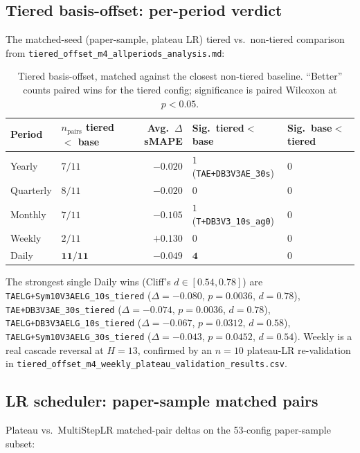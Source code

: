 \documentclass{article}
\begin{document}
\subsection{Tiered basis-offset: per-period verdict}
\label{app:ablations:tiered}

The matched-seed (paper-sample, plateau LR) tiered vs.\ non-tiered comparison from \texttt{tiered\_offset\_m4\_allperiods\_analysis.md}:

\begin{table}[h]
\centering
\small
\caption{Tiered basis-offset, matched against the closest non-tiered baseline. ``Better'' counts paired wins for the tiered config; significance is paired Wilcoxon at $p<0.05$.}
\label{tab:tiered_per_period}
\begin{tabular}{@{}llrll@{}}
\toprule
Period & $n_\text{pairs}$ tiered $<$ base & Avg.\ $\Delta$ sMAPE & Sig.\ tiered$<$base & Sig.\ base$<$tiered \\
\midrule
Yearly    & $7/11$  & $-0.020$ & $1$ (\texttt{TAE+DB3V3AE\_30s}) & $0$ \\
Quarterly & $8/11$  & $-0.020$ & $0$ & $0$ \\
Monthly   & $7/11$  & $-0.105$ & $1$ (\texttt{T+DB3V3\_10s\_ag0}) & $0$ \\
Weekly    & $2/11$  & $\mathbf{+0.130}$ & $0$ & $0$ \\
Daily     & $\mathbf{11/11}$ & $\mathbf{-0.049}$ & $\mathbf{4}$ & $0$ \\
\bottomrule
\end{tabular}
\end{table}

The strongest single Daily wins (Cliff's $d \in [0.54, 0.78]$) are \texttt{TAELG+Sym10V3AELG\_10s\_tiered} ($\Delta = -0.080$, $p=0.0036$, $d=0.78$), \texttt{TAE+DB3V3AE\_30s\_tiered} ($\Delta = -0.074$, $p=0.0036$, $d=0.78$), \texttt{TAELG+DB3V3AELG\_10s\_tiered} ($\Delta = -0.067$, $p=0.0312$, $d=0.58$), \texttt{TAELG+Sym10V3AELG\_30s\_tiered} ($\Delta = -0.043$, $p=0.0452$, $d=0.54$). Weekly is a real cascade reversal at $H=13$, confirmed by an $n=10$ plateau-LR re-validation in \texttt{tiered\_offset\_m4\_weekly\_plateau\_validation\_results.csv}.

\subsection{LR scheduler: paper-sample matched pairs}
\label{app:ablations:lr}

Plateau vs.\ MultiStepLR matched-pair deltas on the 53-config paper-sample subset:
\end{document}
